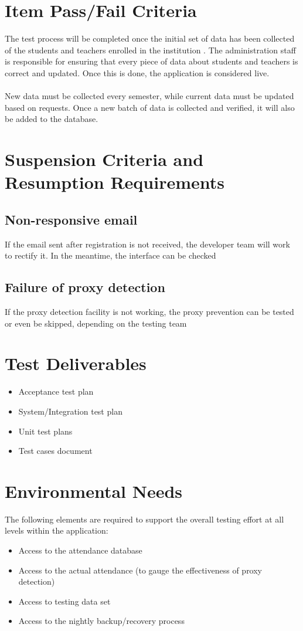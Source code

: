 \documentclass{scrreprt}
\begin{document}
\chapter{Item Pass/Fail Criteria}
The test process will be completed once the initial set of data has been collected of the students and teachers enrolled in the institution . The administration staff is responsible for ensuring that every piece of data about students and teachers is correct and updated. Once this is done, the application is considered live. \\\\
New data must be collected every semester, while current data must be updated based on requests. Once a new batch of data is collected and verified, it will also be added to the database.

\chapter{Suspension Criteria and Resumption Requirements}
\section{Non-responsive email}
If the email sent after registration is not received, the developer team will work to rectify it. In the meantime, the interface can be checked
\section{Failure of proxy detection}
If the proxy detection facility is not working, the proxy prevention can be tested or even be skipped, depending on the testing team

\chapter{Test Deliverables}
\begin{itemize}
    \item Acceptance test plan
    \item System/Integration test plan
    \item Unit test plans
    \item Test cases document
\end{itemize}

\chapter{Environmental Needs}
The following elements are required to support the overall testing effort at all levels within the application:
\begin{itemize}
    \item Access to the attendance database
    \item Access to the actual attendance (to gauge the effectiveness of proxy detection)
    \item Access to testing data set 
    \item Access to the nightly backup/recovery process
\end{itemize}
\end{document}
